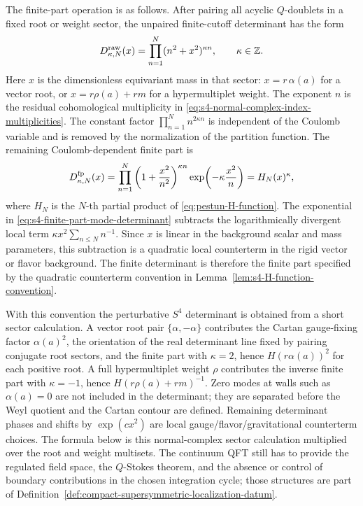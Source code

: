 The finite-part operation is as follows.  After pairing all acyclic
\(Q\)-doublets in a fixed root or weight sector, the unpaired finite-cutoff
determinant has the form
\begin{equation}
  D_{\kappa,N}^{\rm raw}(x)
  =
  \prod_{n=1}^{N}(n^2+x^2)^{\kappa n},
  \qquad \kappa\in\mathbb Z .
  \label{eq:s4-raw-mode-determinant-product}
\end{equation}
Here \(x\) is the dimensionless equivariant mass in that sector:
\(x=r\,\alpha(a)\) for a vector root, or \(x=r\rho(a)+rm\) for a hypermultiplet
weight.  The exponent \(n\) is the residual cohomological multiplicity in
\eqref{eq:s4-normal-complex-index-multiplicities}.  The constant factor
\(\prod_{n=1}^{N}n^{2\kappa n}\) is independent of the Coulomb variable and
is removed by the normalization of the partition function.  The remaining
Coulomb-dependent finite part is
\begin{equation}
  D_{\kappa,N}^{\rm fp}(x)
  =
  \prod_{n=1}^{N}
  \left(1+\frac{x^2}{n^2}\right)^{\kappa n}
  \exp\!\left(-\kappa\frac{x^2}{n}\right)
  =
  H_N(x)^{\kappa},
  \label{eq:s4-finite-part-mode-determinant}
\end{equation}
where \(H_N\) is the \(N\)-th partial product of
\eqref{eq:pestun-H-function}.  The exponential in
\eqref{eq:s4-finite-part-mode-determinant} subtracts the logarithmically
divergent local term
\(\kappa x^2\sum_{n\le N}n^{-1}\).  Since \(x\) is linear in the background
scalar and mass parameters, this subtraction is a quadratic local
counterterm in the rigid vector or flavor background.  The finite determinant
is therefore the finite part specified by the quadratic counterterm convention in
Lemma~\ref{lem:s4-H-function-convention}.

With this convention the perturbative \(S^4\) determinant is obtained from a
short sector calculation.  A vector root pair \(\{\alpha,-\alpha\}\) contributes
the Cartan gauge-fixing factor \(\alpha(a)^2\), the orientation of the real
determinant line fixed by pairing conjugate root sectors, and the finite part
with \(\kappa=2\), hence \(H(r\alpha(a))^2\) for each positive root.  A full
hypermultiplet weight \(\rho\) contributes the inverse finite part with
\(\kappa=-1\), hence \(H(r\rho(a)+rm)^{-1}\).  Zero modes at walls such as
\(\alpha(a)=0\) are not included in the determinant; they are separated before
the Weyl quotient and the Cartan contour are defined.  Remaining determinant
phases and shifts by \(\exp(c x^2)\) are local gauge/flavor/gravitational
counterterm choices.  The formula below is this normal-complex sector
calculation multiplied over the root and weight multisets.  The continuum QFT
still has to provide the regulated field space, the \(Q\)-Stokes theorem, and
the absence or control of boundary contributions in the chosen integration
cycle; those structures are part of
Definition~\ref{def:compact-supersymmetric-localization-datum}.

